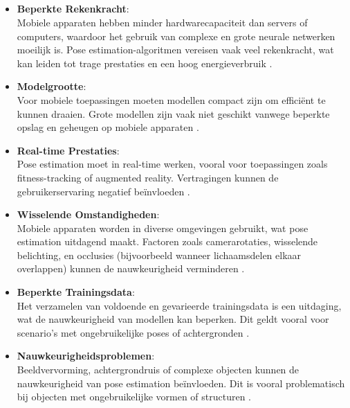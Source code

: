 \subsection{}%
\label{subsec:uitdagingen-van-pose-estimation-op-mobiele-apparaten}
\begin{itemize}
    \item \textbf{Beperkte Rekenkracht}: \\
    Mobiele apparaten hebben minder hardwarecapaciteit dan servers of computers, waardoor het gebruik van complexe en grote neurale netwerken moeilijk is. Pose estimation-algoritmen vereisen vaak veel rekenkracht, wat kan leiden tot trage prestaties en een hoog energieverbruik \autocite{LiuEtAl2022}.

    \item \textbf{Modelgrootte}: \\
    Voor mobiele toepassingen moeten modellen compact zijn om efficiënt te kunnen draaien. Grote modellen zijn vaak niet geschikt vanwege beperkte opslag en geheugen op mobiele apparaten \autocite{HouEtAl2020}.

    \item \textbf{Real-time Prestaties}: \\
    Pose estimation moet in real-time werken, vooral voor toepassingen zoals fitness-tracking of augmented reality. Vertragingen kunnen de gebruikerservaring negatief beïnvloeden \autocite{HouEtAl202}.

    \item \textbf{Wisselende Omstandigheden}: \\
    Mobiele apparaten worden in diverse omgevingen gebruikt, wat pose estimation uitdagend maakt. Factoren zoals camerarotaties, wisselende belichting, en occlusies (bijvoorbeeld wanneer lichaamsdelen elkaar overlappen) kunnen de nauwkeurigheid verminderen \autocite{SulongEtAl2023}.

    \item \textbf{Beperkte Trainingsdata}: \\
    Het verzamelen van voldoende en gevarieerde trainingsdata is een uitdaging, wat de nauwkeurigheid van modellen kan beperken. Dit geldt vooral voor scenario’s met ongebruikelijke poses of achtergronden \autocite{PauloEtAl2024}.

    \item \textbf{Nauwkeurigheidsproblemen}: \\
    Beeldvervorming, achtergrondruis of complexe objecten kunnen de nauwkeurigheid van pose estimation beïnvloeden. Dit is vooral problematisch bij objecten met ongebruikelijke vormen of structuren \autocite{SulongEtAl2023}.
\end{itemize}

